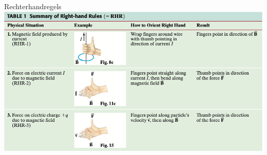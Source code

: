 \begin{summ}[Rechterhandregels]{Rechterhandregels}
    \centering
    \includegraphics[scale=0.45]{Images/Magnetisme/RechterhandRegels}
\end{summ}

